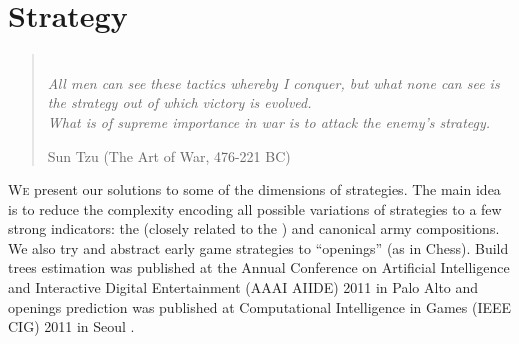 \chapter{Strategy}
\label{chapter:strategy}
\begin{quotation}
\\
\textit{All men can see these tactics whereby I conquer, but what none can see is the strategy out of which victory is evolved.}\\
\textit{What is of supreme importance in war is to attack the enemy's strategy.}\\
\begin{flushright}Sun Tzu (The Art of War, 476-221 BC)\end{flushright}
\end{quotation}

\lettrine{W}e present our solutions to some of the dimensions of strategies. The main idea is to reduce the complexity encoding all possible variations of strategies to a few strong indicators: the  (closely related to the ) and canonical army compositions. We also try and abstract early game strategies to ``openings'' (as in Chess). Build trees estimation was published at the Annual Conference on Artificial Intelligence and Interactive Digital Entertainment (AAAI AIIDE) 2011 in Palo Alto \citep{SYNNAEVE:StratPred} and openings prediction was published at Computational Intelligence in Games (IEEE CIG) 2011 in Seoul \citep{SYNNAEVE:OpeningPred}.





